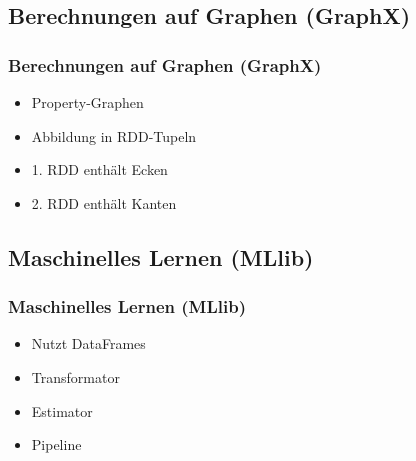 \documentclass[hyperref={pdfpagelabels=false}]{beamer}
\begin{document}
\subsection{Berechnungen auf Graphen (GraphX)}
\begin{frame} 
\frametitle{Berechnungen auf Graphen (GraphX)}

\begin{itemize}
	\item Property-Graphen
	\item Abbildung in RDD-Tupeln
	\item 1. RDD enthält Ecken
	\item 2. RDD enthält Kanten	
\end{itemize}

\begin{figure}[h]
  \centering
\end{figure}

\end{frame}

\subsection{Maschinelles Lernen (MLlib)}
\begin{frame} 
\frametitle{Maschinelles Lernen (MLlib)}

\begin{itemize}
	\item Nutzt DataFrames
	\item Transformator
	\item Estimator
	\item Pipeline
\end{itemize}

\begin{figure}[h]
  \centering
\end{figure}

\end{frame}
\end{document}
